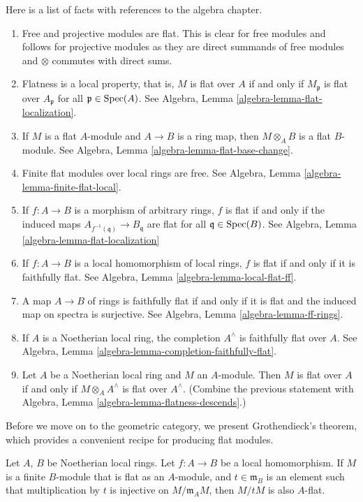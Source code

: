 \noindent
Here is a list of facts with references to the algebra chapter.
\begin{enumerate}
\item Free and projective modules are flat. This is clear for free modules
and follows for projective modules as they are direct summands of free
modules and $\otimes$ commutes with direct sums.
\item Flatness is a local property, that is, $M$ is flat over $A$
if and only if $M_{\mathfrak p}$ is flat over $A_{\mathfrak p}$ for all
$\mathfrak p \in \mathop{\mathrm{Spec}}(A)$.
See Algebra, Lemma \ref{algebra-lemma-flat-localization}.
\item If $M$ is a flat $A$-module and $A \to B$ is a ring map,
then $M \otimes_A B$ is a flat $B$-module. See
Algebra, Lemma \ref{algebra-lemma-flat-base-change}.
\item Finite flat modules over local rings are free.
See Algebra, Lemma \ref{algebra-lemma-finite-flat-local}.
\item If $f : A \to B$ is a morphism of arbitrary rings,
$f$ is flat if and only if the induced maps
$A_{f^{-1}(\mathfrak q)} \to B_{\mathfrak q}$ are flat for all
$\mathfrak q \in \mathop{\mathrm{Spec}}(B)$.
See Algebra, Lemma \ref{algebra-lemma-flat-localization}
\item If $f : A \to B$ is a local homomorphism of local rings,
$f$ is flat if and only if it is faithfully flat.
See Algebra, Lemma \ref{algebra-lemma-local-flat-ff}.
\item A map $A \to B$ of rings is faithfully flat if and only if it is
flat and the induced map on spectra is surjective.
See Algebra, Lemma \ref{algebra-lemma-ff-rings}.
\item If $A$ is a Noetherian local ring, the completion
$A^\wedge$ is faithfully flat over $A$.
See Algebra, Lemma \ref{algebra-lemma-completion-faithfully-flat}.
\item Let $A$ be a Noetherian local ring and $M$ an $A$-module.
Then $M$ is flat over $A$ if and only if $M \otimes_A A^\wedge$
is flat over $A^\wedge$. (Combine the previous statement with
Algebra, Lemma \ref{algebra-lemma-flatness-descends}.)
\end{enumerate}
Before we move on to the geometric category, we present Grothendieck's
theorem, which provides a convenient recipe for producing flat
modules.

\begin{theorem}
\label{theorem-flatness-grothendieck}
Let $A$, $B$ be Noetherian local rings.
Let $f : A \to B$ be a local homomorphism.
If $M$ is a finite $B$-module that is flat as an $A$-module,
and $t \in \mathfrak m_B$ is an element such that multiplication
by $t$ is injective on $M/\mathfrak m_AM$, then $M/tM$ is also $A$-flat.
\end{theorem}

